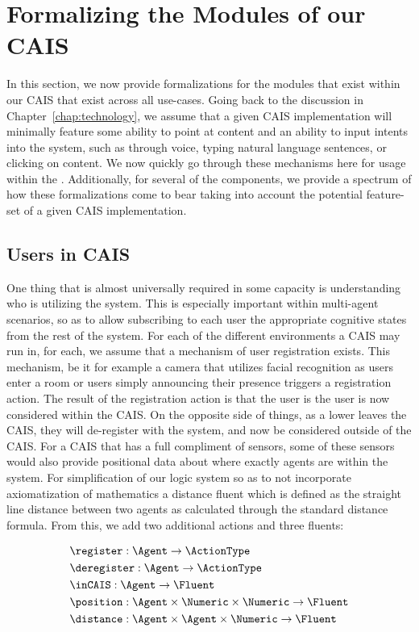 \section{Formalizing the Modules of our CAIS}

In this section, we now provide formalizations for the modules that exist within our
CAIS that exist across all use-cases. Going back to the discussion in 
Chapter~\ref{chap:technology}, we assume that a given CAIS implementation will minimally
feature some ability to point at content and an ability to input intents into the system,
such as through voice, typing natural language sentences, or clicking on content. We now
quickly go through these mechanisms here for usage within the \CEC. Additionally, for
several of the components, we provide a spectrum of how these formalizations come to bear
taking into account the potential feature-set of a given CAIS implementation.

\subsection{Users in CAIS}

One thing that is almost universally required in some capacity is understanding who is
utilizing the system. This is especially important within multi-agent scenarios, so
as to allow subscribing to each user the appropriate cognitive states from the rest
of the system. For each of the different environments a CAIS may run in, for each,
we assume that a mechanism of user registration exists. This mechanism, be it for
example a camera that utilizes facial recognition as users enter a room or users
simply announcing their presence triggers a registration action. The result of the
registration action is that the user is the user is now considered within the CAIS.
On the opposite side of things, as a lower leaves the CAIS, they will de-register
with the system, and now be considered outside of the CAIS. For a CAIS that has a
full compliment of sensors, some of these sensors would also provide positional
data about where exactly agents are within the system. For simplification of our
logic system so as to not incorporate axiomatization of mathematics a distance
fluent which is defined as the straight line distance between two agents as calculated
through the standard distance formula. From this, we add two
additional actions and three fluents:

\begin{equation*}
\begin{aligned}
  & \register: \Agent \rightarrow \ActionType \\
  & \deregister: \Agent \rightarrow \ActionType \\
  & \inCAIS: \Agent \rightarrow \Fluent \\
  & \position: \Agent \times \Numeric \times \Numeric \rightarrow \Fluent \\
  & \distance: \Agent \times \Agent \times \Numeric \rightarrow \Fluent \\
\end{aligned}
\end{equation*}

